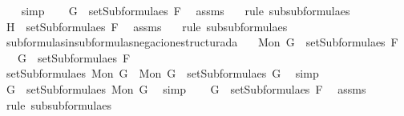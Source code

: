 \begin{isabellebody}
\ {}\ \isamarkupfalse%
\ simp\isanewline
\ \ \isamarkupfalse%
\ {\isachardoublequoteopen}G\ {\isasymin}\ setSubformulae{\isacharunderscore}s\ F{\isachardoublequoteclose}\ \isamarkupfalse%
\ assms\ {}\ \isamarkupfalse%
\ {\isacharparenleft}rule\ subsubformulae{\isacharunderscore}s{\isacharparenright}\isanewline
\ \ \isamarkupfalse%
\ {\isachardoublequoteopen}H\ {\isasymin}\ setSubformulae{\isacharunderscore}s\ F{\isachardoublequoteclose}\ \isamarkupfalse%
\ assms\ {}\ \isamarkupfalse%
\ {\isacharparenleft}rule\ subsubformulae{\isacharunderscore}s{\isacharparenright}\isanewline
{}\isamarkupfalse%
%
\endisatagproof
{\isafoldproof}%
%
\isadelimproof
\isanewline
%
\endisadelimproof
\isanewline
{}\isamarkupfalse%
\ subformulas{\isacharunderscore}in{\isacharunderscore}subformulas{\isacharunderscore}negacion{\isacharunderscore}estructurada{\isacharcolon}\isanewline
\ \ \ {\isachardoublequoteopen}Mon\ G\ {\isasymin}\ setSubformulae{\isacharunderscore}s\ F{\isachardoublequoteclose}\isanewline
\ \ \ {\isachardoublequoteopen}G\ {\isasymin}\ setSubformulae{\isacharunderscore}s\ F{\isachardoublequoteclose}\isanewline
%
\isadelimproof
%
\endisadelimproof
%
\isatagproof
{}\isamarkupfalse%
\ {\isacharminus}\isanewline
\ \ \isamarkupfalse%
\ {\isachardoublequoteopen}setSubformulae{\isacharunderscore}s\ {\isacharparenleft}Mon\ G{\isacharparenright}\ {\isacharequal}\ {\isacharbraceleft}Mon\ G{\isacharbraceright}\ {\isasymunion}\ setSubformulae{\isacharunderscore}s\ G{\isachardoublequoteclose}\ \isamarkupfalse%
\ simp\ \isanewline
\ \ \isamarkupfalse%
\ \isamarkupfalse%
\ {}{\isacharcolon}{\isachardoublequoteopen}G\ {\isasymin}\ setSubformulae{\isacharunderscore}s\ {\isacharparenleft}Mon\ G{\isacharparenright}{\isachardoublequoteclose}\ \isamarkupfalse%
\ simp\isanewline
\ \ \isamarkupfalse%
\ {\isachardoublequoteopen}G\ {\isasymin}\ setSubformulae{\isacharunderscore}s\ F{\isachardoublequoteclose}\ \isamarkupfalse%
\ assms\ {}\ \isamarkupfalse%
\ {\isacharparenleft}rule\ subsubformulae{\isacharunderscore}s{\isacharparenright}\isanewline
{}\isamarkupfalse%
%
\endisatagproof
{\isafoldproof}%
%
\isadelimproof
%
\endisadelimproof
%
\begin{isamarkuptext}%

\end{isamarkuptext}
\end{isabellebody}
